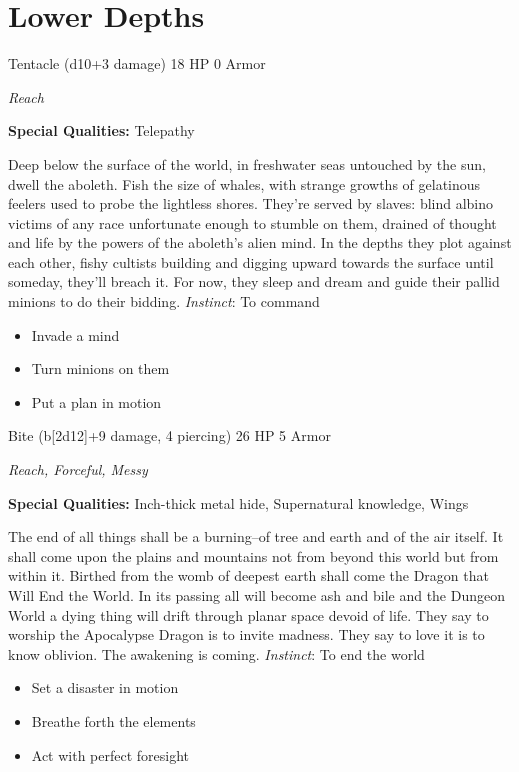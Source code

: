 \section{Lower Depths}
\HRule
{}

Tentacle (d10+3 damage)\hspace*{\fill} 18 HP 0 Armor

\emph{Reach}

\textbf{Special Qualities:}
Telepathy

\HRule
Deep below the surface of the world, in freshwater seas untouched by the sun, dwell the aboleth. Fish the size of whales, with strange growths of gelatinous feelers used to probe the lightless shores. They're served by slaves: blind albino victims of any race unfortunate enough to stumble on them, drained of thought and life by the powers of the aboleth's alien mind. In the depths they plot against each other, fishy cultists building and digging upward towards the surface until someday, they'll breach it. For now, they sleep and dream and guide their pallid minions to do their bidding. \emph{Instinct}: To command
\begin{itemize}
\item Invade a mind
\item Turn minions on them
\item Put a plan in motion
\end{itemize}
\newpage
\HRule
{}

Bite (b[2d12]+9 damage, 4 piercing)\hspace*{\fill} 26 HP 5 Armor

\emph{Reach, Forceful, Messy}

\textbf{Special Qualities:}
Inch-thick metal hide, Supernatural knowledge, Wings

\HRule
The end of all things shall be a burning--of tree and earth and of the air itself. It shall come upon the plains and mountains not from beyond this world but from within it. Birthed from the womb of deepest earth shall come the Dragon that Will End the World. In its passing all will become ash and bile and the Dungeon World a dying thing will drift through planar space devoid of life. They say to worship the Apocalypse Dragon is to invite madness. They say to love it is to know oblivion. The awakening is coming. \emph{Instinct}: To end the world
\begin{itemize}
\item Set a disaster in motion
\item Breathe forth the elements
\item Act with perfect foresight
\end{itemize}

